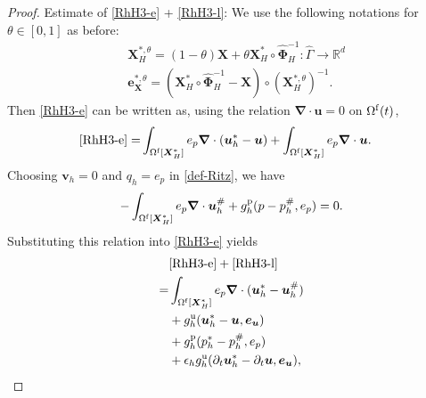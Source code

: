 \documentclass[11pt,reqno]{amsart}
\theoremstyle{definition}
\theoremstyle{plain}
\numberwithin{theorem}{section}
\numberwithin{proposition}{section}
\numberwithin{lemma}{section}
\numberwithin{equation}{section}
\newcommand{\bs}[1]{\boldsymbol{#1}}
\newcommand{\uu}[1]  {{\bs{#1}} }
\newcommand{\grad}   { \uu{\nabla}    }
\def\d{\mathrm{d}}
\newcommand{\bu}{\uu{u}}
\renewcommand{\(}{\bigl(}
\renewcommand{\)}{\bigr)}
\begin{document}
\begin{proof}
 Estimate of \eqref{RhH3-e} + \eqref{RhH3-l}: We use the following notations for $\theta\in[0,1] $ as before:  
\begin{align*}
& {\bs X}_H^{*,\theta} = (1-\theta) {\bs X} + \theta {\bs X}_H^*\circ \widehat{\bs\Phi}_H^{-1}: \widehat\Gamma\rightarrow \mathbb{R}^d \\
& {\bs e}_{\bs X}^{*,\theta} = ({\bs X}_H^*\circ \widehat{\bs\Phi}_H^{-1} - {\bs X})\circ ({\bs X}_H^{*,\theta})^{-1} . 
\end{align*}
Then \eqref{RhH3-e} can be written as, using the relation $\grad\cdot{\bs u}=0$ on $\Omega^{\rm f}(t)$, 
\begin{align*}
\eqref{RhH3-e}  
=& \int_{\Omega^{\rm f}[\bs X_H^*]}  e_p \grad\cdot({\bs u}_h^*-{\bs u}) + \int_{\Omega^{\rm f}[\bs X_H^*]}  e_p \grad\cdot{\bs u} .
\end{align*}
Choosing ${\bs v}_h=0$ and $q_h=e_p$ in \eqref{def-Ritz}, we have 
\begin{align}
-\int_{\Omega^{\rm f}[\bs X_H^*]} e_p \grad\cdot{\bs u}_h^\#
+ g_h^{\rm p} (p - p_h^\#, e_p ) = 0 .
\end{align}
Substituting this relation into \eqref{RhH3-e} yields 
\begin{subequations}\label{RhH3-e-l-abcd}
\begin{align}
&\eqref{RhH3-e} + \eqref{RhH3-l} \notag\\
=& \int_{\Omega^{\rm f}[\bs X_H^*]}  e_p \grad\cdot({\bs u}_h^*-{\bs u}_h^\#) \label{RhH3-e-l-a}\\
& + g_h^{\rm u} (\bu_h^*-{\bs u},{\bs e}_{\bs u} ) \label{RhH3-e-l-c}\\
& + g_h^{\rm p} (p_h^*- p_h^\#,e_p ) \label{RhH3-e-l-d} \\
& + \epsilon_h g_h^{\rm u} (\partial_t\bu_h^*-\partial_t{\bs u},{\bs e}_{\bs u} ) , \label{RhH3-e-l-e}

\end{align}
\end{subequations}
\end{proof}
\end{document}
